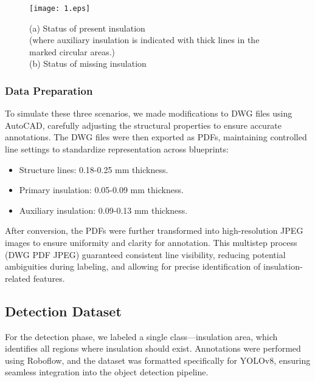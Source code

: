\documentclass[]{IEEEphot}
\begin{document}
\begin{figure}[htbp]
\centering
\texttt{[image: 1.eps]}
\caption{(a) Status of present insulation\\\hspace*{1em}\hspace*{1em}\hspace*{1em}\hspace*{1em}\hspace*{1em}(where auxiliary insulation is indicated with thick lines in the marked circular areas.) \\
\hspace*{1em}\hspace*{1em}\hspace*{1em} (b) Status of missing insulation}
\end{figure}

\subsubsection{Data Preparation}
To simulate these three scenarios, we made modifications to DWG files using AutoCAD, carefully adjusting the structural properties to ensure accurate annotations. The DWG files were then exported as PDFs, maintaining controlled line settings to standardize representation across blueprints:
    \begin{itemize}
        \item Structure lines: 0.18-0.25 mm thickness.
        \item Primary insulation: 0.05-0.09 mm thickness.
        \item Auxiliary insulation: 0.09-0.13 mm thickness.
    \end{itemize}
After conversion, the PDFs were further transformed into high-resolution JPEG images to ensure uniformity and clarity for annotation. This multistep process (DWG PDF JPEG) guaranteed consistent line visibility, reducing potential ambiguities during labeling, and allowing for precise identification of insulation-related features.
\subsection{Detection Dataset}
For the detection phase, we labeled a single class—insulation area, which identifies all regions where insulation should exist. Annotations were performed using Roboflow, and the dataset was formatted specifically for YOLOv8, ensuring seamless integration into the object detection pipeline.
\end{document}
